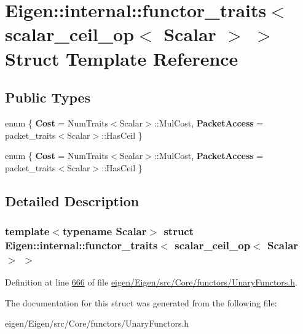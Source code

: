\hypertarget{struct_eigen_1_1internal_1_1functor__traits_3_01scalar__ceil__op_3_01_scalar_01_4_01_4}{}\section{Eigen\+:\+:internal\+:\+:functor\+\_\+traits$<$ scalar\+\_\+ceil\+\_\+op$<$ Scalar $>$ $>$ Struct Template Reference}
\label{struct_eigen_1_1internal_1_1functor__traits_3_01scalar__ceil__op_3_01_scalar_01_4_01_4}
\subsection*{Public Types}
\begin{DoxyCompactItemize}
\item 
\mbox{\label{struct_eigen_1_1internal_1_1functor__traits_3_01scalar__ceil__op_3_01_scalar_01_4_01_4_aee4f9d3621aba7096d9ee0543002acb3}} 
enum \{ {\bfseries Cost} = Num\+Traits$<$Scalar$>$\+:\+:Mul\+Cost, 
{\bfseries Packet\+Access} = packet\+\_\+traits$<$Scalar$>$\+:\+:Has\+Ceil
 \}
\item 
\mbox{\label{struct_eigen_1_1internal_1_1functor__traits_3_01scalar__ceil__op_3_01_scalar_01_4_01_4_a4ca85bc03244b9d0e7c9931e6acef9fb}} 
enum \{ {\bfseries Cost} = Num\+Traits$<$Scalar$>$\+:\+:Mul\+Cost, 
{\bfseries Packet\+Access} = packet\+\_\+traits$<$Scalar$>$\+:\+:Has\+Ceil
 \}
\end{DoxyCompactItemize}


\subsection{Detailed Description}
\subsubsection*{template$<$typename Scalar$>$\newline
struct Eigen\+::internal\+::functor\+\_\+traits$<$ scalar\+\_\+ceil\+\_\+op$<$ Scalar $>$ $>$}



Definition at line \hyperlink{eigen_2_eigen_2src_2_core_2functors_2_unary_functors_8h_source_l00666}{666} of file \hyperlink{eigen_2_eigen_2src_2_core_2functors_2_unary_functors_8h_source}{eigen/\+Eigen/src/\+Core/functors/\+Unary\+Functors.\+h}.



The documentation for this struct was generated from the following file\+:\begin{DoxyCompactItemize}
\item 
eigen/\+Eigen/src/\+Core/functors/\+Unary\+Functors.\+h\end{DoxyCompactItemize}
